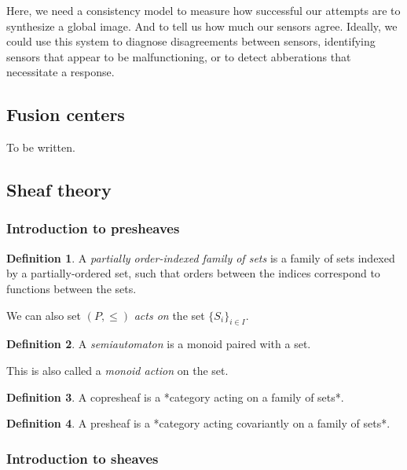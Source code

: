 \documentclass[]             %
{NASA}                       %
\theoremstyle{definition}
\newtheorem{definition}{Definition}[section]
\begin{document}
Here, we need a consistency model to measure how successful our attempts
are to synthesize a global image. And to tell us how much our sensors
agree. Ideally, we could use this system to diagnose disagreements
between sensors, identifying sensors that appear to be malfunctioning,
or to detect abberations that necessitate a response.

\hypertarget{fusion-centers}{%
  \subsection{Fusion centers}\label{fusion-centers}}

To be written.

\hypertarget{sheaf-theory}{%
  \subsection{Sheaf theory}\label{sheaf-theory}}

\hypertarget{introduction-to-presheaves}{%
  \subsubsection{Introduction to
    presheaves}\label{introduction-to-presheaves}}

\begin{definition}
  A \emph{partially order-indexed family of sets} is a family of sets indexed by a partially-ordered set,
  such that orders between the indices correspond to functions between the sets.
\end{definition}

We can also set \((P, \leq)\) \emph{acts on} the set
\(\{S_i\}_{i \in I}\).

\begin{definition}
  A \emph{semiautomaton} is a monoid paired with a set.
\end{definition}

This is also called a \emph{monoid action} on the set.

\begin{definition}
  A copresheaf is a *category acting on a family of sets*.
\end{definition}

\begin{definition}
  A presheaf is a *category acting covariantly on a family of sets*.
\end{definition}

\hypertarget{introduction-to-sheaves}{%
  \subsubsection{Introduction to sheaves}\label{introduction-to-sheaves}}
\end{document}
